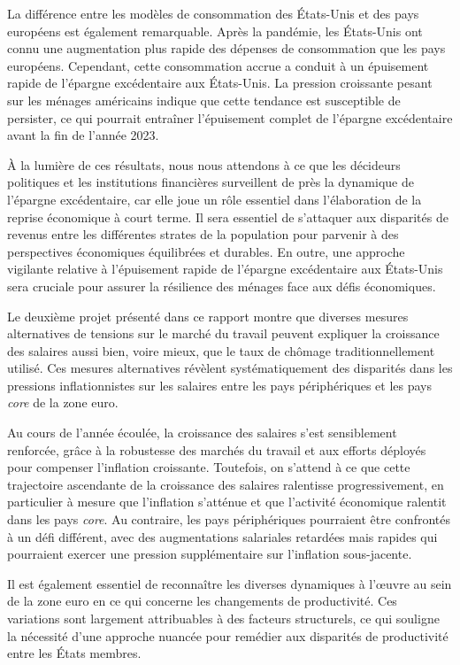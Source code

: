 La différence entre les modèles de consommation des États-Unis et des pays européens est également remarquable. 
Après la pandémie, les États-Unis ont connu une augmentation plus rapide des dépenses de consommation que les pays européens. 
Cependant, cette consommation accrue a conduit à un épuisement rapide de l'épargne excédentaire aux États-Unis. 
La pression croissante pesant sur les ménages américains indique que cette tendance est susceptible de persister, ce qui pourrait entraîner l'épuisement complet de l'épargne excédentaire avant la fin de l'année 2023.

À la lumière de ces résultats, nous nous attendons à ce que les décideurs politiques et les institutions financières surveillent de près la dynamique de l'épargne excédentaire, car elle joue un rôle essentiel dans l'élaboration de la reprise économique à court terme. 
Il sera essentiel de s'attaquer aux disparités de revenus entre les différentes strates de la population pour parvenir à des perspectives économiques équilibrées et durables. 
En outre, une approche vigilante relative à l'épuisement rapide de l'épargne excédentaire aux États-Unis sera cruciale pour assurer la résilience des ménages face aux défis économiques.

Le deuxième projet présenté dans ce rapport montre que diverses mesures alternatives de tensions sur le marché du travail peuvent expliquer la croissance des salaires aussi bien, voire mieux, que le taux de chômage traditionnellement utilisé. 
Ces mesures alternatives révèlent systématiquement des disparités dans les pressions inflationnistes sur les salaires entre les pays périphériques et les pays \textit{core} de la zone euro.

Au cours de l'année écoulée, la croissance des salaires s'est sensiblement renforcée, grâce à la robustesse des marchés du travail et aux efforts déployés pour compenser l'inflation croissante. 
Toutefois, on s'attend à ce que cette trajectoire ascendante de la croissance des salaires ralentisse progressivement, en particulier à mesure que l'inflation s'atténue et que l'activité économique ralentit dans les pays \textit{core}. 
Au contraire, les pays périphériques pourraient être confrontés à un défi différent, avec des augmentations salariales retardées mais rapides qui pourraient exercer une pression supplémentaire sur l'inflation sous-jacente.

Il est également essentiel de reconnaître les diverses dynamiques à l'œuvre au sein de la zone euro en ce qui concerne les changements de productivité. 
Ces variations sont largement attribuables à des facteurs structurels, ce qui souligne la nécessité d'une approche nuancée pour remédier aux disparités de productivité entre les États membres.








